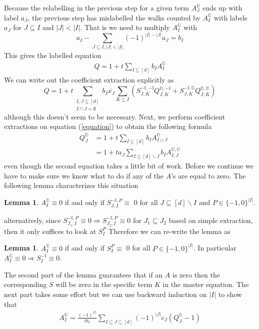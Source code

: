 \documentclass[12pt]{article}
\newcommand{\oo}{\mathbb{O}}
\newcommand{\one}{\mathbb{I}}
\theoremstyle{definition} \newtheorem{definition}[theorem]{Definition}
\newtheorem{lemma}[theorem]{Lemma}
\newcommand{\ol}[1]{\overline{#1}}
\newcommand{\exx}{\!\!}
\newcommand{\exxx}{\!\!\!}
\begin{document}
Because the relabelling in the previous step for a given term $A_J^\oo$ ends up with label $a_J$, the previous step has mislabelled the walks counted by $A_I^\oo$ with labels $a_J$ for $J\subseteq I$ and $|J| < |I|$. That is we need to multiply $A_I^\oo$ with
\[
    a_I - \sum_{J\subseteq I,|J|<|I|}(-1)^{|I|-|J|}a_J = b_I
\]
This gives the labelled equation
\begin{align}\label{equation}
   Q = 1 + t \sum_{I\subseteq [d]}b_I A_I^{\oo}
\end{align}
We can write out the coefficient extraction explicitly as
\[
Q = 1  +t\sum_{\substack{I,J\subseteq[d]\\ I\cap J = \emptyset}}b_I\ol{x_J}\sum_{K\subseteq I}\left(S_{J,K}^{-\one,-\one}Q_{J,K}^{\oo,-\one}+S_{J,K}^{-\one,\oo}Q_{J,K}^{\oo,\oo}\right)
\]
although this doesn't seem to be necessary. Next, we perform coefficient extractions on equation (\ref{equation}) to obtain the following formula
\begin{align}
  Q_{J}^{\oo} &= 1 + t\sum_{I\subseteq [d]}b_I A_{I\cup J}^{\oo}\\
                        &= 1 + t a_J \exxx\sum_{I\subseteq[d]\backslash J}\exx b_I A_{I,J}^{\oo,\oo}
\end{align}
even though the second equation takes a little bit of work. Before we continue we have to make sure we know what to do if any of the $A$'s are equal to zero. The following lemma characterizes this situation
\begin{lemma} $A_{I}^{\oo} \equiv 0$ if and only if $S_{J,I}^{-\one,P} \equiv$ 0 for all $J \subseteq [d]\backslash I$ and $P \in \{-1,0\}^{|I|}$.
\end{lemma}
alternatively, since $S_{J_1,I}^{-\one,P} \equiv 0 \Rightarrow S_{J_2,I}^{-\one,P} \equiv 0$ for $J_1\subseteq J_2$ based on simple extraction, then it only suffices to look at $S_{I}^{P}$ Therefore we can re-write the lemma as
\begin{lemma} $A_{I}^{\oo} \equiv 0$ if and only if $S_{I}^{P} \equiv$ 0 for all $P \in \{-1,0\}^{|I|}$. In particular $A_I^{\oo} \equiv 0 \Rightarrow S_I^{-\one} \equiv 0 $.
\end{lemma}
The second part of the lemma guarantees that if an $A$ is zero then the corresponding $S$ will be zero in the specific term $K$ in the master equation. The next part takes some effort but we can use backward induction on $|I|$ to show that
\begin{align}
A_I^\oo = \frac{(-1)^{|I|}}{t b_I} \sum_{I\subseteq J \subseteq [d]}(-1)^{|J|} c_J (Q_J^\oo - 1)
\end{align}
\end{document}
